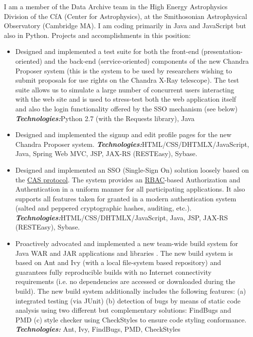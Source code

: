 \documentclass[helvetica,english,logo,notitle,totpages,utf8]{europecv2013}
\newcommand{\technologies}[0]{\textbf{\textit{Technologies:}}}
\begin{document}
\begin{europecv}
                  {I am a member of the Data Archive team in the High Energy Astrophysics Division of the CfA (Center for Astrophysics),
    at the Smithosonian Astrophysical Observatory (Cambridge MA). I am coding primarily in Java and JavaScript but also in Python.
    Projects and accomplishments in this position:
    \begin{itemize}
      \item Designed and implemented a test suite for both the front-end (presentation-oriented) and the back-end (service-oriented)
    components of the new Chandra Proposer system (this is the system to be used by researchers wishing to submit proposals for
    use rights on the Chandra X-Ray telescope). The test suite allows us to simulate a large number of concurrent users
    interacting with the web site and is used to stress-test both the web application itself and also the login functionality
    offered by the SSO mechanism
    (see below)
    \technologies Python 2.7 (with the Requests library), Java
  \item Designed and implemented the signup and edit profile pages for the new Chandra Proposer system.
      \technologies HTML/CSS/DHTMLX/JavaScript, Java, Spring Web MVC, JSP, JAX-RS (RESTEasy), Sybase.    
  \item Designed and implemented an SSO (Single-Sign On) solution loosely based on the
    \href{https://en.wikipedia.org/wiki/Central_Authentication_Service}{CAS protocol}. The system provides
    an \href{https://en.wikipedia.org/wiki/Role-based_access_control}{RBAC}-based Authorization
    and Authentication in a uniform manner for all participating applications. It also supports all features
    taken for granted in a modern authentication system (salted and peppered cryptographic hashes, auditing, etc.).
      \technologies HTML/CSS/DHTMLX/JavaScript, Java, JSP, JAX-RS (RESTEasy), Sybase.
    \item Proactively advocated and implemented a new team-wide build system for Java WAR
      and JAR applications and libraries . The new build system is based on Ant and Ivy
      (with a local file-system based repository) and guarantees
    fully reproducible builds with no Internet connectivity requirements (i.e. no dependencies are accessed or downloaded during
    the build). The new build system
    additionally includes the following features: (a) integrated testing (via JUnit) (b) detection of bugs by means
    of static code analysis using two different but complementary solutions: FindBugs and PMD (c) style checker using
    CheckStyles to ensure code styling conformance. 
      \technologies{} Ant, Ivy, FindBugs, PMD, CheckStyles
    \end{itemize}
                  }


\end{europecv}
\end{document}

